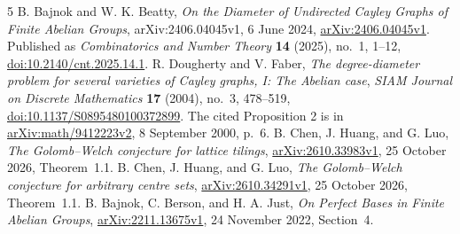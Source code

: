 \documentclass[11pt]{article}
\begin{document}
\begin{thebibliography}{5}
B. Bajnok and W. K. Beatty,
\emph{On the Diameter of Undirected Cayley Graphs of Finite Abelian Groups},
arXiv:2406.04045v1, 6 June 2024,
\href{https://arxiv.org/abs/2406.04045v1}{arXiv:2406.04045v1}.
Published as \emph{Combinatorics and Number Theory} \textbf{14} (2025),
no.~1, 1--12,
\href{https://doi.org/10.2140/cnt.2025.14.1}{doi:10.2140/cnt.2025.14.1}.
R. Dougherty and V. Faber,
\emph{The degree-diameter problem for several varieties of Cayley graphs,
I: The Abelian case},
\emph{SIAM Journal on Discrete Mathematics} \textbf{17} (2004), no.~3,
478--519,
\href{https://doi.org/10.1137/S0895480100372899}{doi:10.1137/S0895480100372899}.
The cited Proposition 2 is in
\href{https://arxiv.org/abs/math/9412223v2}{arXiv:math/9412223v2},
8 September 2000, p.~6.
B. Chen, J. Huang, and G. Luo,
\emph{The Golomb--Welch conjecture for lattice tilings},
\href{https://arxiv.org/abs/2610.33983v1}{arXiv:2610.33983v1},
25 October 2026, Theorem~1.1.
B. Chen, J. Huang, and G. Luo,
\emph{The Golomb--Welch conjecture for arbitrary centre sets},
\href{https://arxiv.org/abs/2610.34291v1}{arXiv:2610.34291v1},
25 October 2026, Theorem~1.1.
B. Bajnok, C. Berson, and H. A. Just,
\emph{On Perfect Bases in Finite Abelian Groups},
\href{https://arxiv.org/abs/2211.13675v1}{arXiv:2211.13675v1},
24 November 2022, Section~4.
\end{thebibliography}
\end{document}
